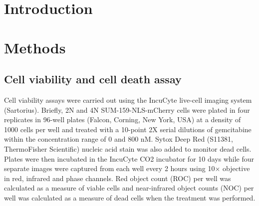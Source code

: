 \documentclass[11pt,notitlepage]{article}
\begin{document}
\section*{Introduction}


\clearpage
\section*{Methods}







\subsection*{Cell viability and cell death assay}
Cell viability assays were carried out using the IncuCyte live-cell imaging system (Sartorius). Briefly, 2N and 4N SUM-159-NLS-mCherry cells were plated in four replicates in 96-well plates (Falcon, Corning, New York, USA) at a density of 1000 cells per well and treated with a 10-point 2X serial dilutions of gemcitabine within the concentration range of 0 and 800 nM. Sytox Deep Red (S11381, ThermoFisher Scientific) nucleic acid stain was also added to monitor dead cells. Plates were then incubated in the IncuCyte CO2 incubator for 10 days while four separate images were captured from each well every 2 hours using 10× objective in red, infrared and phase channels. Red object count (ROC) per well was calculated as a measure of viable cells and near-infrared object counts (NOC) per well was calculated as a measure of dead cells when the treatment was performed.
\end{document}
